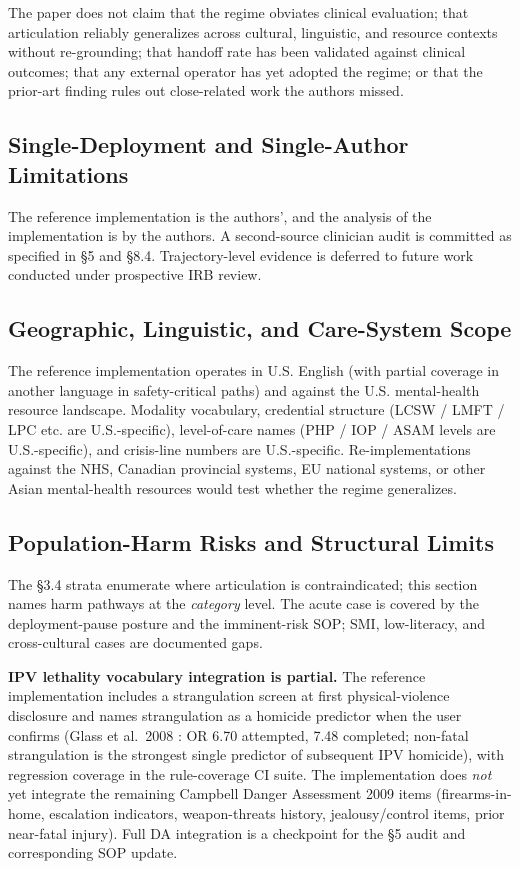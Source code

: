\documentclass[letterpaper]{article}
\begin{document}
The paper does not claim that the regime obviates clinical evaluation; that articulation reliably generalizes across cultural, linguistic, and resource contexts without re-grounding; that handoff rate has been validated against clinical outcomes; that any external operator has yet adopted the regime; or that the prior-art finding rules out close-related work the authors missed.

\subsection{Single-Deployment and Single-Author Limitations}

The reference implementation is the authors', and the analysis of the implementation is by the authors. A second-source clinician audit is committed as specified in \S5 and \S8.4. Trajectory-level evidence is deferred to future work conducted under prospective IRB review.

\subsection{Geographic, Linguistic, and Care-System Scope}

The reference implementation operates in U.S. English (with partial coverage in another language in safety-critical paths) and against the U.S. mental-health resource landscape. Modality vocabulary, credential structure (LCSW / LMFT / LPC etc. are U.S.-specific), level-of-care names (PHP / IOP / ASAM levels are U.S.-specific), and crisis-line numbers are U.S.-specific. Re-implementations against the NHS, Canadian provincial systems, EU national systems, or other Asian mental-health resources would test whether the regime generalizes.

\subsection{Population-Harm Risks and Structural Limits}

The \S3.4 strata enumerate where articulation is contraindicated; this section names harm pathways at the \emph{category} level. The acute case is covered by the deployment-pause posture and the imminent-risk SOP; SMI, low-literacy, and cross-cultural cases are documented gaps.

\textbf{IPV lethality vocabulary integration is partial.} The reference implementation includes a strangulation screen at first physical-violence disclosure and names strangulation as a homicide predictor when the user confirms (Glass et al.~2008 \citep{glass2008strangulation}: OR 6.70 attempted, 7.48 completed; non-fatal strangulation is the strongest single predictor of subsequent IPV homicide), with regression coverage in the rule-coverage CI suite. The implementation does \emph{not} yet integrate the remaining Campbell Danger Assessment 2009 items (firearms-in-home, escalation indicators, weapon-threats history, jealousy/control items, prior near-fatal injury). Full DA integration is a checkpoint for the \S5 audit and corresponding SOP update.
\end{document}
